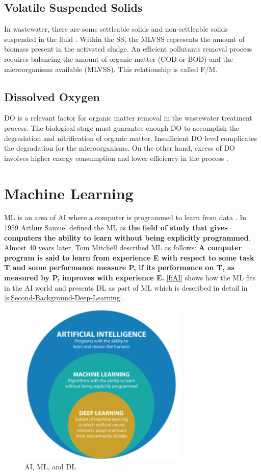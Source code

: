 \subsection{Volatile Suspended Solids}
In wastewater, there are some settleable solids and non-settleable solids suspended in the fluid \cite{Wiesmann2007}. Within the \ac{SS}, the \ac{MLVSS} represents the amount of biomass present in the activated sludge. An efficient pollutants removal process requires balancing the amount of organic matter (\ac{COD} or \ac{BOD}) and the microorganisms available (\ac{MLVSS}). This relationship is called F/M.

\subsection{Dissolved Oxygen}
\ac{DO} is a relevant factor for organic matter removal in the wastewater treatment process. The biological stage must guarantee enough \ac{DO} to accomplish the degradation and nitrification of organic matter. Insufficient \ac{DO} level complicates the degradation for the microorganisms. On the other hand, excess of \ac{DO} involves higher energy consumption and lower efficiency in the process \cite{Zhao2021}. 

\section{Machine Learning}
\label{s:Second-Background-Topic}

\ac{ML} is an area of \ac{AI} where a computer is programmed to learn from data \cite{Ray2019}. In 1959 Arthur Samuel defined the \ac{ML} as \textbf{the field of study that gives computers the ability to learn without being explicitly programmed}. Almost 40 years later, Tom Mitchell described \ac{ML} as follows: \textbf{A computer program is said to learn from experience E with respect to some task T and some performance measure P, if its performance on T, as measured by P, improves with experience E.} \autoref{f:AI} shows how the \ac{ML} fits in the \ac{AI} world and presents \ac{DL} as part of \ac{ML} which is described in detail in \autoref{s:Second-Background-Deep-Learning}.

\begin{figure}[h]
\centering
\includegraphics[width=8cm]{figures/Ch2/AI-ML-DL.pdf}
\caption{AI, ML, and DL \cite{raza_cinquergrana_2018}}
\label{f:AI}
\end{figure}

